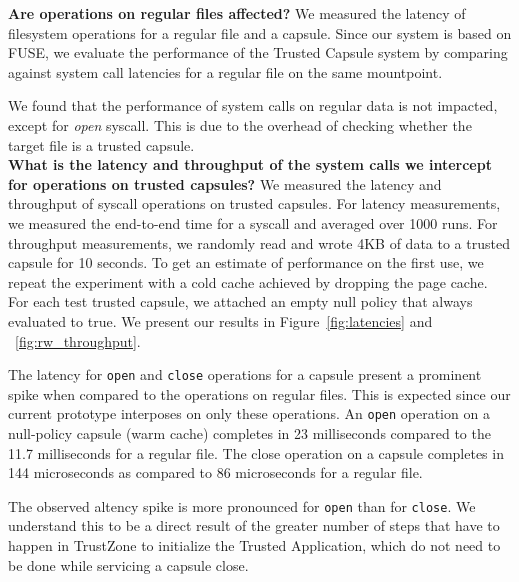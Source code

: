 \textbf{Are operations on regular files affected?} 
We measured the latency of filesystem operations for a regular file and a capsule. Since our system is based on FUSE, we evaluate the performance of the Trusted Capsule system by comparing against system call latencies for a regular file on the same mountpoint.

We found that the performance of system calls on regular data is not impacted, except for \textit{open} syscall. 
This is due to the overhead of checking whether the target file is a trusted capsule. \\

\textbf{What is the latency and throughput of the system calls we
  intercept for operations on trusted capsules?} We measured the
latency and throughput of syscall operations on trusted capsules.  For
latency measurements, we measured the end-to-end time for a syscall
and averaged over 1000 runs.  For throughput measurements, we randomly
read and wrote 4KB of data to a trusted capsule for 10 seconds. To get an estimate of performance on the first use, we repeat the experiment with a cold cache achieved by dropping the page cache. 
For each test trusted capsule, we attached an empty null policy that always evaluated to true.  We present our results in Figure~\ref{fig:latencies} and ~\ref{fig:rw_throughput}.

The latency for \texttt{open} and \texttt{close} operations for a capsule present a prominent spike when compared to the operations on regular files. This is expected since our current prototype interposes on only these operations. An \texttt{open} operation on a null-policy capsule (warm cache) completes in 23 milliseconds compared to the 11.7 milliseconds for a regular file. The close operation on a capsule completes in  144 microseconds as compared to  86 microseconds for a regular file. 

The observed altency spike is more pronounced for \texttt{open} than for \texttt{close}. We understand this to be a direct result of the greater number of steps that have to happen in TrustZone to initialize the Trusted Application, which do not need to be done  while servicing a capsule close. 

